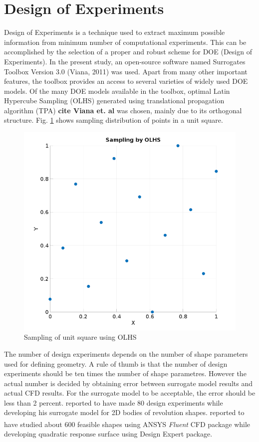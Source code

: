 \section{Design of Experiments}

Design of Experiments is a technique used to extract maximum possible information from minimum number of computational experiments. This can be accomplished by the selection of a proper and robust scheme for DOE (Design of Experiments). In the present study, an open-source software named Surrogates Toolbox Version 3.0 (Viana, 2011) was used. Apart from many other important features, the toolbox provides an access to several varieties of widely used DOE models. Of the many DOE models available in the toolbox, optimal Latin Hypercube Sampling (OLHS) generated using translational propagation algorithm (TPA) \textbf{cite Viana et. al} was chosen, mainly due to its orthogonal structure. Fig. \ref{OLHS Sampling} shows sampling distribution of points in a unit square.

\begin{figure}[htbp]
	\centering
	\includegraphics[width=200 pt]{optimization/OLHS_DOE}
	\caption{Sampling of unit square using OLHS }
	\label{OLHS Sampling}
\end{figure}

 The number of design experiments depends on the number of shape parameters used for defining geometry. A rule of thumb is that the number of design experiments should be ten times the number of shape parametres. However the actual number is decided by obtaining error between surrogate model results and actual CFD results. For the surrogate model to be acceptable, the error should be less than 2 percent. \cite{alam2016mdo} reported to have made 80 design experiments while developing his surrogate model for 2D bodies of revolution shapes. \cite{Kale2005a} reported to have studied about 600 feasible shapes using ANSYS\textsuperscript{\textregistered} \textit{Fluent} CFD package while developing quadratic response surface using Design Expert package.

